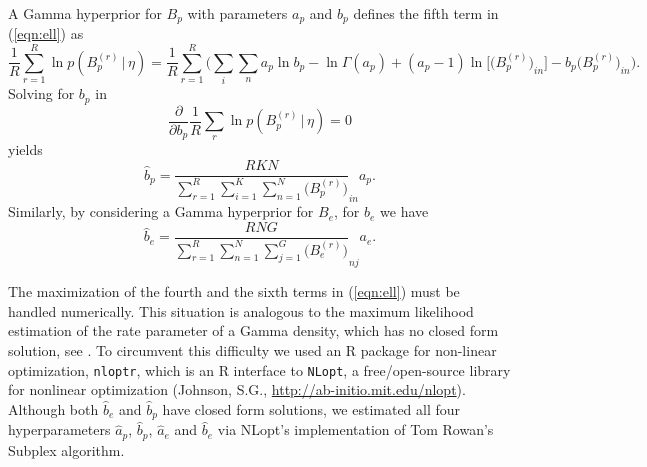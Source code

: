 \documentclass[11pt]{amsart}
\theoremstyle{definition}
\begin{document}
A Gamma hyperprior for $B_p$ with parameters $a_p$ and $b_p$ defines
the fifth term in (\ref{eqn:ell}) as
\[
   \frac{1}{R}\sum_{r=1}^R \ln p(B_p^{(r)}\,|\, \eta)
  =
   \frac{1}{R}\sum_{r=1}^R \bigg(\sum_{i}\sum_{n} a_p\ln b_p
    - \ln\Gamma(a_p) +
   (a_p-1)\ln\big[\big(B_p^{(r)}\big)_{in}\big] -
    b_p\big(B_p^{(r)}\big)_{in}\bigg).
\]
Solving for $b_p$ in
\[
  \frac{\partial}{\partial b_p}
   \frac{1}{R}\sum_r \ln p(B_p^{(r)}\,|\, \eta) = 0
\]
yields
\[
   \hat b_p = \frac{RKN}{\sum_{r=1}^R \sum_{i=1}^K \sum_{n=1}^N
     \big(B_p^{(r)}\big)}_{in}  a_p.
\]
Similarly, by considering a Gamma hyperprior for $B_e$, for $b_e$ we
have
\[
   \hat b_e = \frac{RNG}{\sum_{r=1}^R \sum_{n=1}^N  \sum_{j=1}^G
     \big(B_e^{(r)}\big)}_{nj}  a_e.
\]

The maximization of the fourth and the sixth terms in
(\ref{eqn:ell}) must be handled numerically. This situation is
analogous to the maximum likelihood estimation of the rate parameter
of a Gamma density, which has no closed form solution, see
\cite{CW}. To circumvent this difficulty we used an R package for
non-linear optimization, \texttt{nloptr}, which is an R interface to
\texttt{NLopt}, a free/open-source library for nonlinear optimization
(Johnson, S.G., \url{http://ab-initio.mit.edu/nlopt}).  Although both
$\hat b_e$ and $\hat b_p$ have closed form solutions, we estimated all
four hyperparameters $\hat a_p$, $\hat b_p$, $\hat a_e$ and $\hat b_e$
via NLopt's implementation of Tom Rowan's Subplex algorithm.
\end{document}
